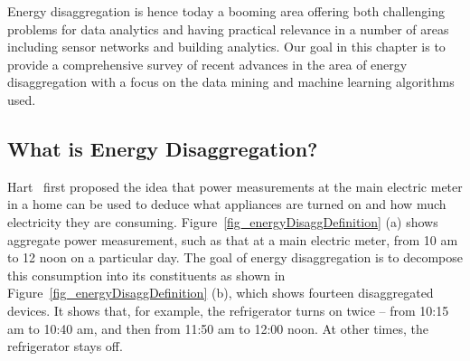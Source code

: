 Energy disaggregation is hence today a booming area offering both
challenging problems for data analytics and having practical relevance in a
number of areas including sensor networks and building analytics.
Our goal in this chapter is to provide a comprehensive survey of recent
advances in the area of energy disaggregation with a focus on the data mining
and machine learning algorithms used. 


\subsection {What is Energy Disaggregation?}

Hart~\cite{hart1992} first proposed the idea that power measurements at the
main electric meter in a home can be used to deduce what appliances are
turned on and how much electricity they are consuming.
Figure~\ref{fig_energyDisaggDefinition} (a) shows aggregate power measurement,
such as that at a main electric meter, from 10 am to 12 noon on a particular
day. The goal of energy disaggregation is to decompose this consumption into
its constituents as shown in Figure~\ref{fig_energyDisaggDefinition} (b),
which shows fourteen disaggregated devices. It shows that, for example, the
refrigerator turns on twice -- from 10:15 am to 10:40 am, and then from 11:50
am to 12:00 noon. At other times, the refrigerator stays off.




